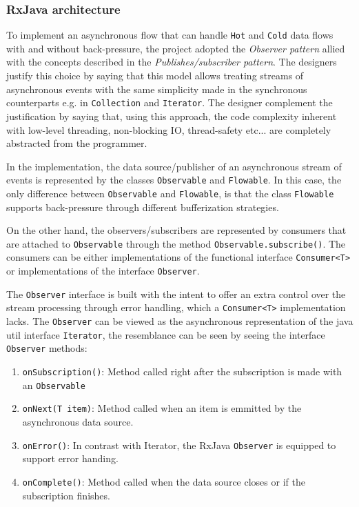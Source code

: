 \subsubsection{RxJava architecture}
To implement an asynchronous flow that can handle \texttt{Hot} and \texttt{Cold} data flows with and without back-pressure, the project adopted the \textit{Observer pattern} allied with the concepts described in the \textit{Publishes/subscriber pattern}.
The designers justify this choice by saying that this model allows treating streams of asynchronous events with the same simplicity made in the synchronous counterparts e.g. in \texttt{Collection} and \texttt{Iterator}. The designer complement the justification by saying that, using this approach, the code complexity inherent with low-level threading, non-blocking IO, thread-safety etc... are completely abstracted from the programmer.

In the implementation, the data source/publisher of an asynchronous stream of events is represented by the classes \texttt{Observable} and \texttt{Flowable}. In this case, the only difference between \texttt{Observable} and \texttt{Flowable}, is that the class \texttt{Flowable} supports back-pressure through different bufferization strategies.

On the other hand, the observers/subscribers are represented by consumers that are attached to \texttt{Observable} through the method \texttt{Observable.subscribe()}.
The consumers can be either implementations of the functional interface \texttt{Consumer<T>} or implementations of the interface \texttt{Observer}.

The \texttt{Observer} interface is built with the intent to offer an extra control over the stream processing through error handling, which a \texttt{Consumer<T>} implementation lacks. The \texttt{Observer} can be viewed as the asynchronous representation of the java util interface \texttt{Iterator}, the resemblance can be seen by seeing the interface \texttt{Observer} methods:

\begin{enumerate}
     \item \texttt{onSubscription()}: Method called right after the subscription is made with an \texttt{Observable} 
	 \item \texttt{onNext(T item)}: Method called when an item is emmitted by the asynchronous data source.
	 \item \texttt{onError()}: In contrast with Iterator, the RxJava \texttt{Observer} is equipped to support error handing.
	 \item \texttt{onComplete()}: Method called when the data source closes or if the subscription finishes.
\end{enumerate}	


